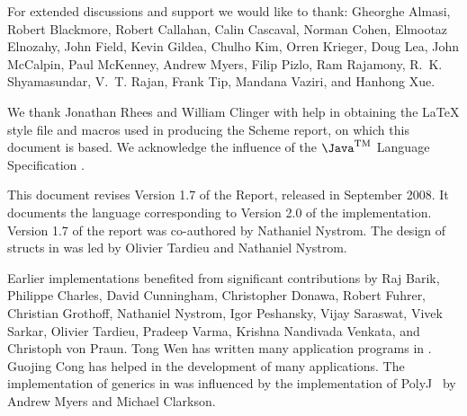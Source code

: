 For extended discussions and support we would like to thank: 
Gheorghe Almasi,
Robert Blackmore,
Robert Callahan, 
Calin Cascaval, 
Norman Cohen, 
Elmootaz Elnozahy, 
John Field,
Kevin Gildea,
Chulho Kim,
Orren Krieger, 
Doug Lea, 
John McCalpin, 
Paul McKenney, 
Andrew Myers,
Filip Pizlo, 
Ram Rajamony,
R.~K. Shyamasundar, 
V.~T. Rajan, 
Frank Tip,
Mandana Vaziri,
and
Hanhong Xue.

We thank Jonathan Rhees and William Clinger with help in obtaining the
\LaTeX{} style file and macros used in producing the Scheme report,
on which this document is based. We acknowledge the influence of
the $\mbox{\Java}^{\mbox{\textsc{tm}}}$ Language
Specification \cite{jls2}.

This document revises Version 1.7 of the Report, released in
September 2008.  It documents the language corresponding to Version
2.0 of the implementation. Version 1.7 of the report was co-authored by
Nathaniel Nystrom. The design of structs in \Xten{} was led by Olivier Tardieu
and Nathaniel Nystrom.

Earlier implementations benefited from significant contributions by
Raj Barik, 
Philippe Charles, 
David Cunningham,
Christopher Donawa, 
Robert Fuhrer,
Christian Grothoff,
Nathaniel Nystrom,  
Igor Peshansky,  
Vijay Saraswat,
Vivek Sarkar, 
Olivier Tardieu,  
Pradeep Varma, 
Krishna Nandivada Venkata, and
Christoph von Praun.
Tong Wen has written many application programs
in \Xten{}. Guojing Cong has helped in the
development of many applications.
The implementation of generics in \Xten{} was influenced by the
implementation of PolyJ~\cite{polyj} by Andrew Myers and Michael Clarkson.

